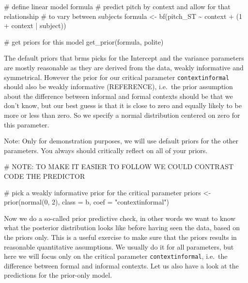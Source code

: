 \documentclass[
  doc,
  longtable,
  nolmodern,
  notxfonts,
  notimes,
  colorlinks=true,linkcolor=blue,citecolor=blue,urlcolor=blue]{apa7}
\newenvironment{Shaded}{\begin{snugshade}}{\end{snugshade}}
\newcommand{\AlertTok}[1]{\textcolor[rgb]{0.68,0.00,0.00}{#1}}
\newcommand{\AttributeTok}[1]{\textcolor[rgb]{0.40,0.45,0.13}{#1}}
\newcommand{\CommentTok}[1]{\textcolor[rgb]{0.37,0.37,0.37}{#1}}
\newcommand{\DecValTok}[1]{\textcolor[rgb]{0.68,0.00,0.00}{#1}}
\newcommand{\FunctionTok}[1]{\textcolor[rgb]{0.28,0.35,0.67}{#1}}
\newcommand{\NormalTok}[1]{\textcolor[rgb]{0.00,0.23,0.31}{#1}}
\newcommand{\OtherTok}[1]{\textcolor[rgb]{0.00,0.23,0.31}{#1}}
\newcommand{\SpecialCharTok}[1]{\textcolor[rgb]{0.37,0.37,0.37}{#1}}
\newcommand{\StringTok}[1]{\textcolor[rgb]{0.13,0.47,0.30}{#1}}
\begin{document}
\begin{Shaded}
\begin{Highlighting}[]
\CommentTok{\# define linear model formula}
\CommentTok{\# predict pitch by context and allow for that relationship }
\CommentTok{\# to vary between subjects}
\NormalTok{formula }\OtherTok{\textless{}{-}} \FunctionTok{bf}\NormalTok{(pitch\_ST }\SpecialCharTok{\textasciitilde{}}\NormalTok{ context }\SpecialCharTok{+}\NormalTok{ (}\DecValTok{1} \SpecialCharTok{+}\NormalTok{ context }\SpecialCharTok{|}\NormalTok{ subject))}

\CommentTok{\# get priors for this model}
\FunctionTok{get\_prior}\NormalTok{(formula, polite)}
\end{Highlighting}
\end{Shaded}

The default priors that brms picks for the Intercept and the variance
parameters are mostly reasonable as they are derived from the data,
weakly informative and symmetrical. However the prior for our critical
parameter \texttt{contextinformal} should also be weakly informative
(REFERENCE), i.e.~the prior assumption about the difference between
informal and formal contexts should be that we don't know, but our best
guess is that it is close to zero and equally likely to be more or less
than zero. So we specify a normal distribution centered on zero for this
parameter.

Note: Only for demonstration purposes, we will use default priors for
the other parameters. You always should critically reflect on all of
your priors.

\begin{Shaded}
\begin{Highlighting}[]
\CommentTok{\# }\AlertTok{NOTE}\CommentTok{: TO MAKE IT EASIER TO FOLLOW WE COULD CONTRAST CODE THE PREDICTOR}

\CommentTok{\# pick a weakly informative prior for the critical parameter}
\NormalTok{priors }\OtherTok{\textless{}{-}} \FunctionTok{prior}\NormalTok{(}\FunctionTok{normal}\NormalTok{(}\DecValTok{0}\NormalTok{, }\DecValTok{2}\NormalTok{), }
                \AttributeTok{class =}\NormalTok{ b, }
                \AttributeTok{coef =} \StringTok{"contextinformal"}\NormalTok{)}
\end{Highlighting}
\end{Shaded}

Now we do a so-called prior predictive check, in other words we want to
know what the posterior distribution looks like before having seen the
data, based on the priors only. This is a useful exercise to make sure
that the priors results in reasonable quantitative assumptions. We
usually do it for all parameters, but here we will focus only on the
critical parameter \texttt{contextinformal}, i.e.~the difference between
formal and informal contexts. Let us also have a look at the predictions
for the prior-only model.
\end{document}
